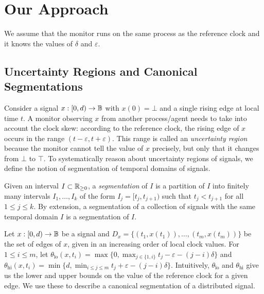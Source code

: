 \section{Our Approach}

We assume that the monitor runs on the same process as the reference clock and it knows the values of $\delta$ and $\varepsilon$.

\subsection{Uncertainty Regions and Canonical Segmentations}

Consider a signal $x : [0,d) \to \mathbb{B}$ with $x(0) = \bot$ and a single rising edge at local time $t$.
A monitor observing $x$ from another process/agent needs to take into account the clock skew: according to the reference clock, the rising edge of $x$ occurs in the range $(t - \varepsilon, t + \varepsilon)$.
This range is called an \emph{uncertainty region} because the monitor cannot tell the value of $x$ precisely, but only that it changes from $\bot$ to $\top$.
To systematically reason about uncertainty regions of signals, we define the notion of segmentation of temporal domains of signals.

\begin{definition}
	Given an interval $I \subset \mathbb{R}_{\geq 0}$, a \emph{segmentation} of $I$ is a partition of $I$ into finitely many intervals $I_1, \ldots, I_k$ of the form $I_j = [t_j, t_{j+1})$ such that $t_j < t_{j+1}$ for all $1 \leq j \leq k$.
	By extension, a segmentation of a collection of signals with the same temporal domain $I$ is a segmentation of $I$.
\end{definition}

Let $x : [0,d) \to \mathbb{B}$ be a signal and $D_x = \{(t_1, x(t_1)), \ldots, (t_m, x(t_m))\}$ be the set of edges of $x$, given in an increasing order of local clock values.
For $1 \leq i \leq m$, let $\theta_{\text{lo}}(x,t_i) = \max\{0, \max_{j \in \{1, i\}} t_j - \varepsilon - (j-i)\delta\}$ and $\theta_{\text{hi}}(x,t_i) = \min\{d, \min_{i \leq j \leq m} t_j + \varepsilon - (j-i)\delta\}$.
Intuitively, $\theta_{\text{lo}}$ and $\theta_{\text{hi}}$ give us the lower and upper bounds on the value of the reference clock for a given edge.
We use these to describe a canonical segmentation of a distributed signal.

